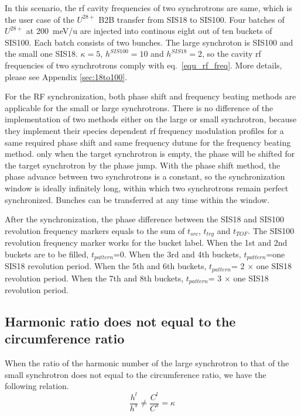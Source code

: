 In this scenario, the rf cavity frequencies of two synchrotrons are same, which is the user case of the $U^{28+}$ B2B transfer from SIS18 to SIS100. Four batches of $U^{28+}$ at \SI{200}{meV/\atomicmassunit} are injected into continous eight out of ten buckets of SIS100. Each batch consists of two bunches. The large synchroton is SIS100 and the small one SIS18. $\kappa=5$, $h^{SIS100}=10$ and $h^{SIS18}=2$, so the cavity rf frequencies of two synchrotrons comply with eq.~\ref{equ_rf_freq}. More details, please see Appendix \ref{sec:18to100}.

For the RF synchronization, both phase shift and frequency beating methods are applicable for the small or large synchrotrons. There is no difference of the implementation of two methods either on the large or small synchrotron, because they implement their species dependent rf frequency modulation profiles for a same required phase shift and same frequency dutune for the frequency beating method. only when the target synchrotron is empty, the phase will be shifted for the target synchrotron by the phase jump. With the phase shift method, the phase advance between two synchrotrons is a constant, so the synchronization window is ideally infinitely long, within which two synchrotrons remain perfect synchronized. Bunches can be transferred at any time within the window.  

After the synchronization, the phase difference between the SIS18 and SIS100 revolution frequency markers equals to the sum of $t_{src}$, $t_{trg}$ and $t_{TOF}$. The SIS100 revolution frequency marker works for the bucket label. When the 1st and 2nd buckets are to be filled, $t_{pattern}$=0. When the 3rd and 4th buckets, $t_{pattern}$=one SIS18 revolution period. When the 5th and 6th buckets, $t_{pattern}$= 2 $\times$ one SIS18 revolution period. When the 7th and 8th buckets, $t_{pattern}$= 3 $\times$ one SIS18 revolution period. 

\subsection{Harmonic ratio does not equal to the circumference ratio} 
\label{sec:cir_no_int1}
When the ratio of the harmonic number of the large synchrotron to that of the small synchrotron does not equal to the circumference ratio, we have the following relation.
\begin{equation}
\frac {h^{l}}{h^{s}}\neq \frac {C^{l}}{C^{s}}= \kappa  \label{harmonic_1_noint}
\end{equation}

